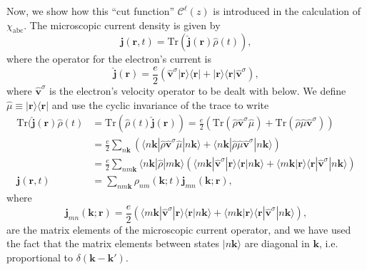 Now, we show how this ``cut function'' $\mathcal{C}^{\ell}(z)$ is introduced in
the calculation of $\chi_{\mathrm{abc}}$. 
The microscopic current density is given by
\begin{equation}\label{jmic}
\mathbf{j}(\mathbf{r},t)=\mathrm{Tr}(\hat{\mathbf{j}}(\mathbf{r})\hat{\rho}(t)),
\end{equation}
where the operator for the electron's current is
\begin{equation}\label{hatjmic}
\hat{\mathbf{j}}(\mathbf{r})=\frac{e}{2}\left(\hat{\mathbf{v}}^{\sigma} |\mathbf{r}\rangle\langle\mathbf{r}|
+ |\mathbf{r}\rangle\langle\mathbf{r}|\hat{\mathbf{v}}^{\sigma}\right), 
\end{equation}
where $\hat{\mathbf{v}}^{\sigma}$ is the electron's velocity operator to be dealt
with below. We define
$\hat{\mu} \equiv |\mathbf{r}\rangle\langle\mathbf{r}|$ and use the cyclic invariance of
the trace to write
\begin{align}\label{jmic2}
\mathrm{Tr}(\hat{\mathbf{j}}(\mathbf{r})\hat{\rho}(t)
&= \mathrm{Tr}(\hat{\rho}(t)\hat{\mathbf{j}}(\mathbf{r}))
= \frac{e}{2}
\left(
  \mathrm{Tr}(\hat{\rho}\hat{\mathbf{v}}^{\sigma}\hat{\mu})
+ \mathrm{Tr}(\hat{\rho}\hat{\mu}\hat{\mathbf{v}}^{\sigma})
\right)\nonumber\\
&= \frac{e}{2}\sum_{n\mathbf{k}}
\left(
\langle n\mathbf{k}| \hat{\rho}\hat{\mathbf{v}}^{\sigma}\hat{\mu} |n\mathbf{k}\rangle
+ \langle n\mathbf{k}| \hat{\rho}\hat{\mu}\hat{\mathbf{v}}^{\sigma} |n\mathbf{k}\rangle
\right)\nonumber\\
&= \frac{e}{2}\sum_{nm\mathbf{k}}\langle n\mathbf{k}|\hat{\rho} |m\mathbf{k}\rangle
\left(
\langle m\mathbf{k}| \hat{\mathbf{v}}^{\sigma}|\mathbf{r}\rangle \langle\mathbf{r}|n\mathbf{k}\rangle
+ \langle m\mathbf{k}|\mathbf{r}\rangle \langle\mathbf{r}| \hat{\mathbf{v}}^{\sigma} |n\mathbf{k}\rangle
\right)
\nonumber\\
\mathbf{j}(\mathbf{r},t)
&= \sum_{nm\mathbf{k}}\rho_{nm}(\mathbf{k};t)\mathbf{j}_{mn}(\mathbf{k};\mathbf{r}),
\end{align}
where
\begin{equation}\label{jmic3}
\mathbf{j}_{mn}(\mathbf{k};\mathbf{r})=
\frac{e}{2}
\left(
\langle m\mathbf{k}| \hat{\mathbf{v}}^{\sigma} |\mathbf{r}\rangle \langle\mathbf{r}|n\mathbf{k}\rangle
+
\langle m\mathbf{k}|\mathbf{r}\rangle \langle\mathbf{r}| \hat{\mathbf{v}}^{\sigma} |n\mathbf{k}\rangle
\right),
\end{equation}
are the matrix elements of the microscopic current operator,
and we have used the fact that the matrix elements between states $|n\mathbf{k}\rangle$
are diagonal in $\mathbf{k}$, i.e. proportional to $\delta(\mathbf{k}-\mathbf{k}')$.


